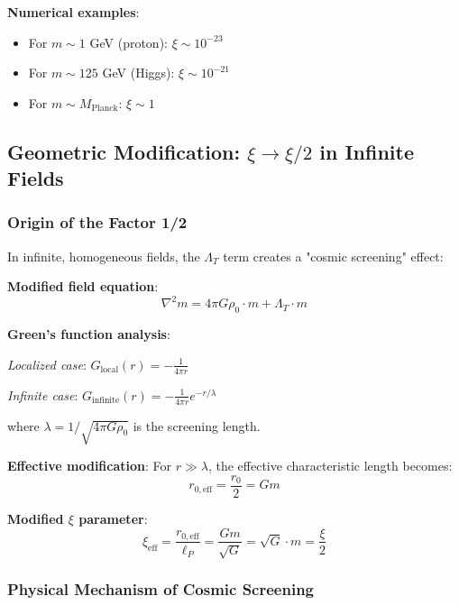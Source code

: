 \documentclass[12pt,a4paper]{article}
\begin{document}
	\textbf{Numerical examples}:
	\begin{itemize}
		\item For $m \sim 1$ GeV (proton): $\xi \sim 10^{-23}$
		\item For $m \sim 125$ GeV (Higgs): $\xi \sim 10^{-21}$
		\item For $m \sim M_{\text{Planck}}$: $\xi \sim 1$
	\end{itemize}
	
	\subsection{Geometric Modification: $\xi \to \xi/2$ in Infinite Fields}
	\label{subsec:xi_modification}
	
	\subsubsection{Origin of the Factor 1/2}
	\label{subsubsec:factor_half_origin}
	
	In infinite, homogeneous fields, the $\Lambda_T$ term creates a "cosmic screening" effect:
	
	\textbf{Modified field equation}:
	\begin{equation}
		\nabla^2 m = 4\pi G \rho_0 \cdot m + \Lambda_T \cdot m
	\end{equation}
	
	\textbf{Green's function analysis}:
	
	\textit{Localized case}: $G_{\text{local}}(r) = -\frac{1}{4\pi r}$
	
	\textit{Infinite case}: $G_{\text{infinite}}(r) = -\frac{1}{4\pi r} e^{-r/\lambda}$
	
	where $\lambda = 1/\sqrt{4\pi G \rho_0}$ is the screening length.
	
	\textbf{Effective modification}: For $r \gg \lambda$, the effective characteristic length becomes:
	\begin{equation}
		r_{0,\text{eff}} = \frac{r_0}{2} = Gm
	\end{equation}
	
	\textbf{Modified $\xi$ parameter}:
	\begin{equation}
		\boxed{\xi_{\text{eff}} = \frac{r_{0,\text{eff}}}{\ell_P} = \frac{Gm}{\sqrt{G}} = \sqrt{G} \cdot m = \frac{\xi}{2}}
	\end{equation}
	
	\subsubsection{Physical Mechanism of Cosmic Screening}
	\label{subsubsec:cosmic_screening}
	
\end{document}
